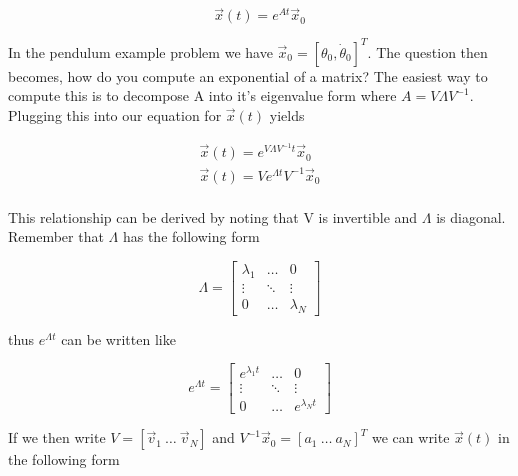 \begin{enumerate}
    \begin{equation}
      \vec{x}(t) = e^{At}\vec{x}_0
    \end{equation}

    In the pendulum example problem we have $\vec{x}_0 = [\theta_0,\dot{\theta}_0]^T$. The question then becomes, how do you
    compute an exponential of a matrix? The easiest way to compute
    this is to decompose A into it's eigenvalue form where $A=V\Lambda
    V^{-1}$. Plugging this into our equation for $\vec{x}(t)$ yields

    \begin{equation}
      \begin{matrix}
        \vec{x}(t) = e^{V\Lambda V^{-1}t}\vec{x}_0 \\
        \vec{x}(t) = Ve^{\Lambda t}V^{-1}\vec{x}_0 \\
      \end{matrix}
    \end{equation}    

    This relationship can be derived by noting that V is invertible
    and $\Lambda$ is diagonal. Remember that $\Lambda$ has the
    following form

    \begin{equation}
      \Lambda = \begin{bmatrix} \lambda_1 & \hdots & 0 \\ \vdots & \ddots
        & \vdots \\ 0 & \hdots & \lambda_N \end{bmatrix}
    \end{equation}

    thus $e^{\Lambda t}$ can be written like

    \begin{equation}
      e^{\Lambda  t}= \begin{bmatrix} e^{\lambda_1 t} & \hdots & 0 \\ \vdots & \ddots
        & \vdots \\ 0 & \hdots & e^{\lambda_N t} \end{bmatrix}
    \end{equation}

    If we then write $V = [\vec{v}_1~\hdots~\vec{v}_N]$ and
      $V^{-1}\vec{x}_0 = [a_1~\hdots~a_N]^T$ we can write $\vec{x}(t)$
      in the following form


\end{enumerate}
